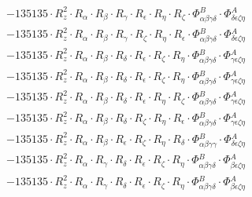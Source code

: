 \documentclass{article}
\begin{document}
\begin{subequations}
\begin{gather}
\begin{array}{c}
 \\[0.2em] 		 - 135135 \cdot R_{z}^{2} \cdot R_{\alpha{}} \cdot R_{\beta{}} \cdot R_{\gamma{}} \cdot R_{\epsilon{}} \cdot R_{\eta{}} \cdot R_{\zeta{}} \cdot \Phi{}^{B}_{\alpha{}\beta{}\gamma{}\delta{}} \cdot \Phi{}^{A}_{\delta{}\epsilon{}\zeta{}\eta{}} 
 \\[0.2em] 		 - 135135 \cdot R_{z}^{2} \cdot R_{\alpha{}} \cdot R_{\beta{}} \cdot R_{\gamma{}} \cdot R_{\zeta{}} \cdot R_{\eta{}} \cdot R_{\epsilon{}} \cdot \Phi{}^{B}_{\alpha{}\beta{}\gamma{}\delta{}} \cdot \Phi{}^{A}_{\delta{}\epsilon{}\zeta{}\eta{}} 
 \\[0.2em] 		 - 135135 \cdot R_{z}^{2} \cdot R_{\alpha{}} \cdot R_{\beta{}} \cdot R_{\delta{}} \cdot R_{\epsilon{}} \cdot R_{\zeta{}} \cdot R_{\eta{}} \cdot \Phi{}^{B}_{\alpha{}\beta{}\gamma{}\delta{}} \cdot \Phi{}^{A}_{\gamma{}\epsilon{}\zeta{}\eta{}} 
 \\[0.2em] 		 - 135135 \cdot R_{z}^{2} \cdot R_{\alpha{}} \cdot R_{\beta{}} \cdot R_{\delta{}} \cdot R_{\epsilon{}} \cdot R_{\zeta{}} \cdot R_{\eta{}} \cdot \Phi{}^{B}_{\alpha{}\beta{}\gamma{}\delta{}} \cdot \Phi{}^{A}_{\gamma{}\epsilon{}\zeta{}\eta{}} 
 \\[0.2em] 		 - 135135 \cdot R_{z}^{2} \cdot R_{\alpha{}} \cdot R_{\beta{}} \cdot R_{\delta{}} \cdot R_{\epsilon{}} \cdot R_{\eta{}} \cdot R_{\zeta{}} \cdot \Phi{}^{B}_{\alpha{}\beta{}\gamma{}\delta{}} \cdot \Phi{}^{A}_{\gamma{}\epsilon{}\zeta{}\eta{}} 
 \\[0.2em] 		 - 135135 \cdot R_{z}^{2} \cdot R_{\alpha{}} \cdot R_{\beta{}} \cdot R_{\delta{}} \cdot R_{\zeta{}} \cdot R_{\eta{}} \cdot R_{\epsilon{}} \cdot \Phi{}^{B}_{\alpha{}\beta{}\gamma{}\delta{}} \cdot \Phi{}^{A}_{\gamma{}\epsilon{}\zeta{}\eta{}} 
 \\[0.2em] 		 - 135135 \cdot R_{z}^{2} \cdot R_{\alpha{}} \cdot R_{\beta{}} \cdot R_{\epsilon{}} \cdot R_{\zeta{}} \cdot R_{\eta{}} \cdot R_{\delta{}} \cdot \Phi{}^{B}_{\alpha{}\beta{}\gamma{}\gamma{}} \cdot \Phi{}^{A}_{\delta{}\epsilon{}\zeta{}\eta{}} 
 \\[0.2em] 		 - 135135 \cdot R_{z}^{2} \cdot R_{\alpha{}} \cdot R_{\gamma{}} \cdot R_{\delta{}} \cdot R_{\epsilon{}} \cdot R_{\zeta{}} \cdot R_{\eta{}} \cdot \Phi{}^{B}_{\alpha{}\beta{}\gamma{}\delta{}} \cdot \Phi{}^{A}_{\beta{}\epsilon{}\zeta{}\eta{}} 
 \\[0.2em] 		 - 135135 \cdot R_{z}^{2} \cdot R_{\alpha{}} \cdot R_{\gamma{}} \cdot R_{\delta{}} \cdot R_{\epsilon{}} \cdot R_{\zeta{}} \cdot R_{\eta{}} \cdot \Phi{}^{B}_{\alpha{}\beta{}\gamma{}\delta{}} \cdot \Phi{}^{A}_{\beta{}\epsilon{}\zeta{}\eta{}} 

\end{array}
\end{gather}
\end{subequations}
\end{document}
